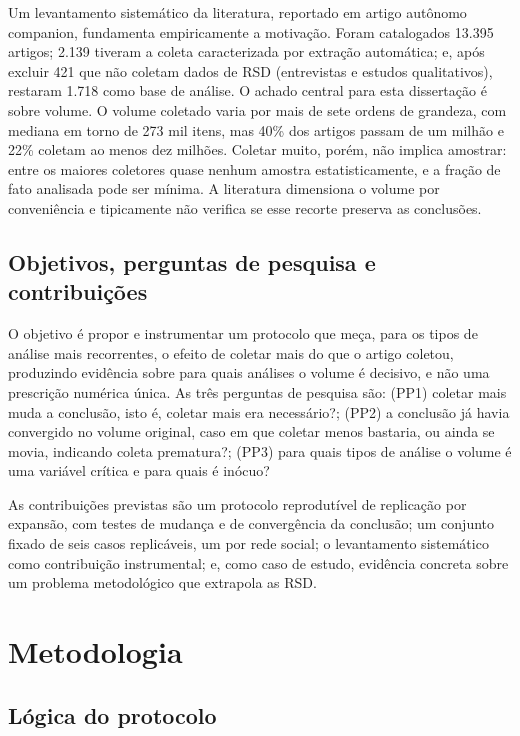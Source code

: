 \documentclass[12pt,a4paper]{article}
\begin{document}
Um levantamento sistemático da literatura, reportado em artigo autônomo companion,
fundamenta empiricamente a motivação. Foram catalogados 13.395 artigos; 2.139
tiveram a coleta caracterizada por extração automática; e, após excluir 421 que não
coletam dados de RSD (entrevistas e estudos qualitativos), restaram 1.718 como base
de análise. O achado central para esta dissertação é sobre volume. O volume
coletado varia por mais de sete ordens de grandeza, com
mediana em torno de 273 mil itens, mas 40\% dos artigos passam de um milhão e 22\%
coletam ao menos dez milhões. Coletar muito, porém, não implica amostrar: entre os
maiores coletores quase nenhum amostra estatisticamente, e a fração de fato
analisada pode ser mínima. A literatura dimensiona o volume por conveniência e
tipicamente não verifica se esse recorte preserva as conclusões.

\subsection{Objetivos, perguntas de pesquisa e contribuições}

O objetivo é propor e instrumentar um protocolo que meça, para os tipos de análise
mais recorrentes, o efeito de coletar mais do que o artigo coletou, produzindo
evidência sobre para quais análises o volume é decisivo, e não uma prescrição
numérica única. As três perguntas de pesquisa são: (PP1) coletar mais muda a
conclusão, isto é, coletar mais era necessário?; (PP2) a conclusão já havia
convergido no volume original, caso em que coletar menos bastaria, ou ainda se
movia, indicando coleta prematura?; (PP3) para quais tipos de análise o volume é
uma variável crítica e para quais é inócuo?

As contribuições previstas são um protocolo reprodutível de replicação por
expansão, com testes de mudança e de convergência da conclusão; um conjunto fixado
de seis casos replicáveis, um por rede social; o levantamento sistemático como
contribuição instrumental; e, como caso de estudo, evidência concreta sobre um
problema metodológico que extrapola as RSD.

\section{Metodologia}

\subsection{Lógica do protocolo}
\end{document}
